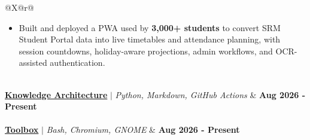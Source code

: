\documentclass[10pt,a4paper]{article}
\begin{document}
\begin{tabularx}{\linewidth}{@{}X@{\extracolsep{\fill}}r@{}}
{\begin{minipage}[t]{\linewidth}
    \begin{itemize}[leftmargin=*, itemsep=1pt, parsep=0pt, topsep=2pt, partopsep=0pt]
        \item Built and deployed a PWA used by \textbf{3,000+ students} to convert SRM Student Portal data into live timetables and attendance planning, with session countdowns, holiday-aware projections, admin workflows, and OCR-assisted authentication.
    \end{itemize}
\end{minipage}
}\\[2pt]
\noalign{\vskip2pt}
\href{https://github.com/AndysTMC/knowledge-architecture}{\textbf{Knowledge Architecture}} $|$ \textit{Python, Markdown, GitHub Actions} & \textbf{Aug 2026 - Present} \\
\\[2pt]
\href{https://github.com/AndysTMC/toolbox}{\textbf{Toolbox}} $|$ \textit{Bash, Chromium, GNOME} & \textbf{Aug 2026 - Present} \\
\end{tabularx}

\end{document}

